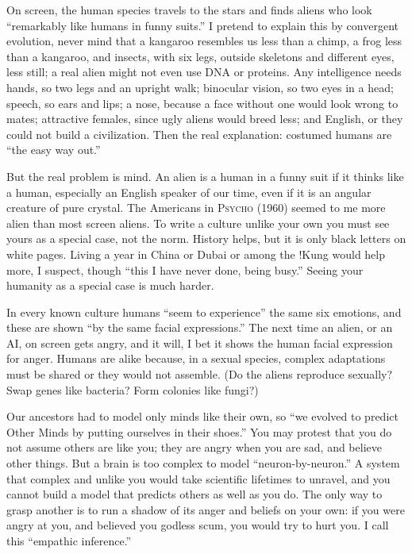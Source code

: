 
On screen, the human species travels to the stars and finds aliens who look ``remarkably like humans in funny suits.'' I pretend to explain this by convergent evolution, never mind that a kangaroo resembles us less than a chimp, a frog less than a kangaroo, and insects, with six legs, outside skeletons and different eyes, less still; a real alien might not even use DNA or proteins. Any intelligence needs hands, so two legs and an upright walk; binocular vision, so two eyes in a head; speech, so ears and lips; a nose, because a face without one would look wrong to mates; attractive females, since ugly aliens would breed less; and English, or they could not build a civilization. Then the real explanation: costumed humans are ``the easy way out.''

But the real problem is mind. An alien is a human in a funny suit if it thinks like a human, especially an English speaker of our time, even if it is an angular creature of pure crystal. The Americans in \textsc{Psycho} (1960) seemed to me more alien than most screen aliens. To write a culture unlike your own you must see yours as a special case, not the norm. History helps, but it is only black letters on white pages. Living a year in China or Dubai or among the !Kung would help more, I suspect, though ``this I have never done, being busy.'' Seeing your humanity as a special case is much harder.

In every known culture humans ``seem to experience'' the same six emotions, and these are shown ``by the same facial expressions.''  The next time an alien, or an AI, on screen gets angry, and it will, I bet it shows the human facial expression for anger. Humans are alike because, in a sexual species, complex adaptations must be shared or they would not assemble. (Do the aliens reproduce sexually? Swap genes like bacteria? Form colonies like fungi?)

Our ancestors had to model only minds like their own, so ``we evolved to predict Other Minds by putting ourselves in their shoes.'' You may protest that you do not assume others are like you; they are angry when you are sad, and believe other things. But a brain is too complex to model ``neuron-by-neuron.'' A system that complex and unlike you would take scientific lifetimes to unravel, and you cannot build a model that predicts others as well as you do. The only way to grasp another is to run a shadow of its anger and beliefs on your own: if you were angry at you, and believed you godless scum, you would try to hurt you. I call this ``empathic inference.'' 

